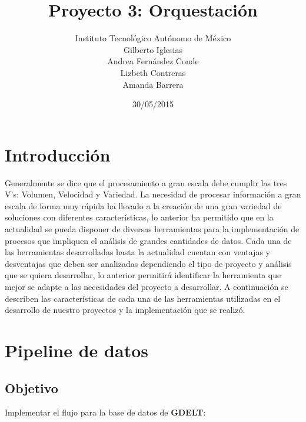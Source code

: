 \documentclass[]{article}
\title{Proyecto 3: Orquestación}
\author{Instituto Tecnológico Autónomo de México \\ Gilberto Iglesias \\ Andrea Fernández Conde \\ Lizbeth Contreras \\ Amanda Barrera}
\date{30/05/2015}
\begin{document}
\maketitle


{
\hypersetup{linkcolor=black}
\setcounter{tocdepth}{3}
\tableofcontents
}
\pagebreak

\section{Introducción}\label{introduccion}

Generalmente se dice que el procesamiento a gran escala debe cumplir las
tres V's: Volumen, Velocidad y Variedad. La necesidad de procesar
información a gran escala de forma muy rápida ha llevado a la creación
de una gran variedad de soluciones con diferentes características, lo
anterior ha permitido que en la actualidad se pueda disponer de diversas
herramientas para la implementación de procesos que impliquen el
análisis de grandes cantidades de datos. Cada una de las herramientas
desarrolladas hasta la actualidad cuentan con ventajas y desventajas que
deben ser analizadas dependiendo el tipo de proyecto y análisis que se
quiera desarrollar, lo anterior permitirá identificar la herramienta que
mejor se adapte a las necesidades del proyecto a desarrollar. A
continuación se describen las características de cada una de las
herramientas utilizadas en el desarrollo de nuestro proyectos y la
implementación que se realizó.

\section{Pipeline de datos}\label{pipeline-de-datos}

\subsection{Objetivo}\label{objetivo}

Implementar el flujo para la base de datos de \textbf{GDELT}:
\end{document}
